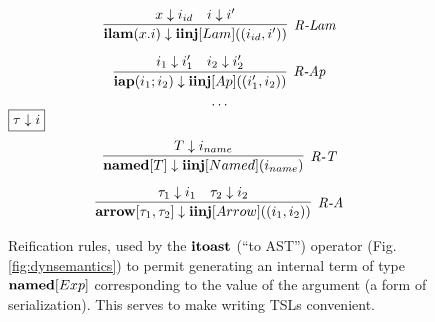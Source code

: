 \begin{figure}[t]
\begin{minipage}[t]{.44\textwidth}
\[\begin{array}{c}
\infer[\textit{R-Lam}]
	{ \keyw{ilam}(x.i) \downarrow \keyw{iinj}[Lam]((i_{id}, i')) }
	{x \downarrow i_{id} & i \downarrow i'} \\[2ex]

\infer[\textit{R-Ap}]
	{ \keyw{iap}(i_1; i_2) \downarrow \keyw{iinj}[Ap]((i_1', i_2))}
	{ i_1 \downarrow i_1' & i_2 \downarrow i_2' }\\[1ex]
\cdots
\vspace{-10px}
\end{array}
\]
$\fbox{$\tau \downarrow i$}$
\vspace{-12px}
\[
\begin{array}{c}
\infer[\textit{R-T}]
	{ \keyw{named}[T] \downarrow \keyw{iinj}[Named](i_{name}) }
	{ T \downarrow i_{name}} \\[2ex]

\infer[\textit{R-A}]
	{ \keyw{arrow}[\tau_1,\tau_2] \downarrow \keyw{iinj}[Arrow]((i_1, i_2))  }
	{ \tau_1 \downarrow i_1 & \tau_2 \downarrow i_2 }
\end{array}
\]
\label{fig:reification}
\caption{Reification rules, used by the $\textbf{itoast}$ (``to AST'') operator (Fig. \ref{fig:dynsemantics}) to permit generating an internal term of type $\textbf{named}[Exp]$ corresponding to the value of the argument (a form of serialization). This serves to make writing TSLs convenient.}
\end{minipage}
\end{figure}

